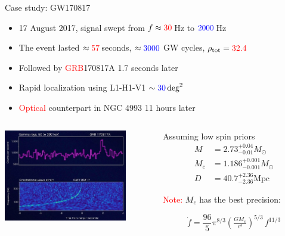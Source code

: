 \documentclass[xcolor=dvipsnames,handout,t]{beamer}
\newcommand{\red}[1]{\textcolor{red}{#1}}
\newcommand{\bl}[1]{\textcolor{blue}{#1}}
\newcommand{\f}{\frac}
\begin{document}
\begin{frame}{Case study: GW170817}
  \begin{itemize}
    \item 17 August 2017, signal swept from $f\approx \red{30}\,$Hz to $\bl{2000}\,$Hz 
    \item The event lasted $\approx \red{57}\,$seconds, $\approx \bl{3000}$ GW cycles, $\rho_\text{tot} = \red{32.4}$
    \item Followed by \red{GRB}170817A 1.7 seconds later
    \item Rapid localization using L1-H1-V1 $\sim \bl{30}\,\text{deg}^2$
    \item \red{Optical} counterpart in NGC 4993 11 hours later
  \end{itemize}  

  \begin{columns}
  \begin{column}{0.5\textwidth}  %
      \begin{center}
      \includegraphics[height=4cm]{figs/GW_GRB170817.jpg}
      \end{center}
  \end{column}
  \begin{column}{0.5\textwidth}
  {
    Assuming low spin priors
    \begin{align*}
     M&=2.73^{+0.04}_{-0.01} M_\odot \\
     M_c &=1.186^{+0.001}_{-0.001}M_\odot  \\ 
     D&=40.7^{+2.36}_{-2.36}\text{Mpc}
    \end{align*}
  }
  {
    \red{Note:} $M_c$ has the best precision: 
   \begin{small}$${\dot{f}} = \f{96}{5}\pi^{8/3} \left(\tfrac{G M_c}{c^3}\right)^{5/3}\, {f^{11/3}}$$ \end{small}
  } 
    
    \end{column}
  \end{columns} 
  
  

\end{frame}
\end{document}
